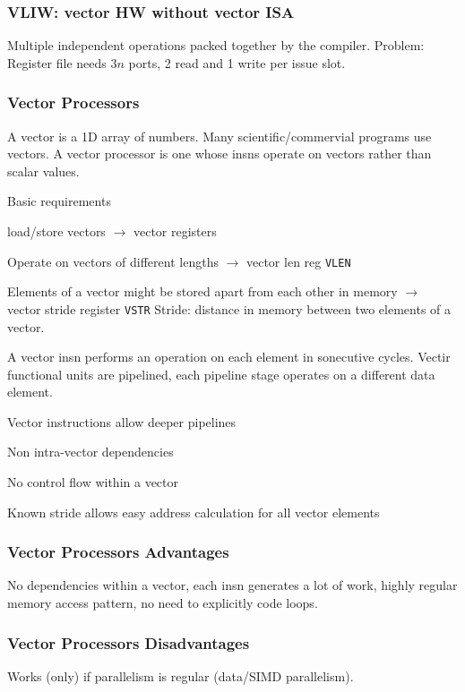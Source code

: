 \documentclass[a4paper, fontsize=8pt, landscape, DIV=1]{scrartcl}
\makeatletter
\renewenvironment{outline}[1][]{%
  \ifthenelse{\equal{#1}{}}{}{\renewcommand{\ol@type}{#1}}%
  \ol@z%
  \newcommand{\0}{\ol@toz\ol@z}%
  \newcommand{\1}{\vspace{\dimexpr\outlinespacingscalar\baselineskip-\baselineskip}\ol@toi\ol@i\item}%
  \newcommand{\2}{\vspace{\dimexpr\outlinespacingscalartwo\baselineskip-\baselineskip}\ol@toii\ol@ii\item}%
  \newcommand{\3}{\vspace{\dimexpr\outlinespacingscalar\baselineskip-\baselineskip}\ol@toiii\ol@iii\item}%
  \newcommand{\4}{\vspace{\dimexpr\outlinespacingscalar\baselineskip-\baselineskip}\ol@toiiii\ol@iiii\item}%
}{%
  \ol@toz\ol@exit%
}
\def\outlinespacingscalar{0.5}
\def\outlinespacingscalartwo{0.5}
\makeatother
\begin{document}
\begin{multicols*}{4}
  \subsubsection{VLIW: vector HW without vector ISA}
  Multiple independent operations packed together by the compiler.
  Problem: Register file needs $3n$ ports, 2 read and 1 write per issue slot.

  \subsubsection{Vector Processors}
  A vector is a 1D array of numbers. Many scientific/commervial programs use vectors.
  A vector processor is one whose insns operate on vectors rather than scalar values.

  Basic requirements
  \begin{outline}
    \1 load/store vectors $\to$ vector registers
    \1 Operate on vectors of different lengths $\to$ vector len reg \texttt{VLEN}
    \1 Elements of a vector might be stored apart from each other in memory $\to$ 
    vector stride register \texttt{VSTR}
  \end{outline}
  Stride: distance in memory between two elements of a vector.

  A vector insn performs an operation on each element in sonecutive cycles. Vectir functional units
  are pipelined, each pipeline stage operates on a different data element.

  Vector instructions allow deeper pipelines
  \begin{outline}
    \1 Non intra-vector dependencies
    \1 No control flow within a vector
    \1 Known stride allows easy address calculation for all vector elements
  \end{outline}

  \subsubsection{Vector Processors Advantages}
  No dependencies within a vector, each insn generates a lot of work, highly regular
  memory access pattern, no need to explicitly code loops.

  \subsubsection{Vector Processors Disadvantages}
  Works (only) if parallelism is regular (data/SIMD parallelism). 



\end{multicols*}
\end{document}
